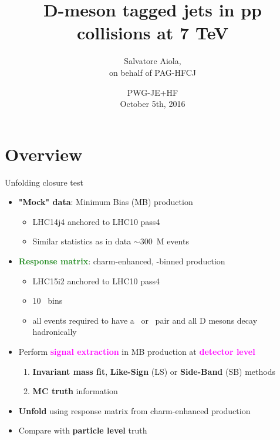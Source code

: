 \documentclass[xcolor={usenames,dvipsnames}]{beamer}
\title[D-tagged jets in pp collisions at 7 TeV] %
{D-meson tagged jets in pp collisions at 7 TeV}
\author[Salvatore Aiola]%
{Salvatore Aiola,\\
on behalf of PAG-HFCJ}
\institute[Yale University] %
{Yale University}
\date[PWG-JE+HF - Oct. 5th, 2016] %
{PWG-JE+HF \\
October 5th, 2016}
\begin{document}
\begin{frame}
  \titlepage
\end{frame}





\section{Overview}
\begin{frame}{Unfolding closure test}
\begin{itemize}
\item \textbf{\textcolor{BrickRed}{"Mock" data}}: Minimum Bias (MB) production
\begin{itemize}
\item LHC14j4 anchored to LHC10 pass4
\item Similar statistics as in data $\sim 300$~M events
\end{itemize}
\item \textbf{\textcolor{ForestGreen}{Response matrix}}: charm-enhanced, \pthard-binned production
\begin{itemize}
\item LHC15i2 anchored to LHC10 pass4
\item 10 \pthard\ bins
\item all events required to have a \ccbar\ or \bbbar\ pair and all D mesons decay hadronically
\end{itemize}
\item Perform \textbf{\textcolor{Fuchsia}{signal extraction}} in MB production at \textbf{\textcolor{Fuchsia}{detector level}}
\begin{enumerate}
\item \textbf{Invariant mass fit}, \textbf{Like-Sign} (LS) or \textbf{Side-Band} (SB) methods
\item \textbf{MC truth} information
\end{enumerate}
\item \textbf{\textcolor{NavyBlue}{Unfold}} using response matrix from charm-enhanced production
\item Compare with \textbf{\textcolor{NavyBlue}{particle level}} truth
\end{itemize}
\end{frame}
\end{document}
